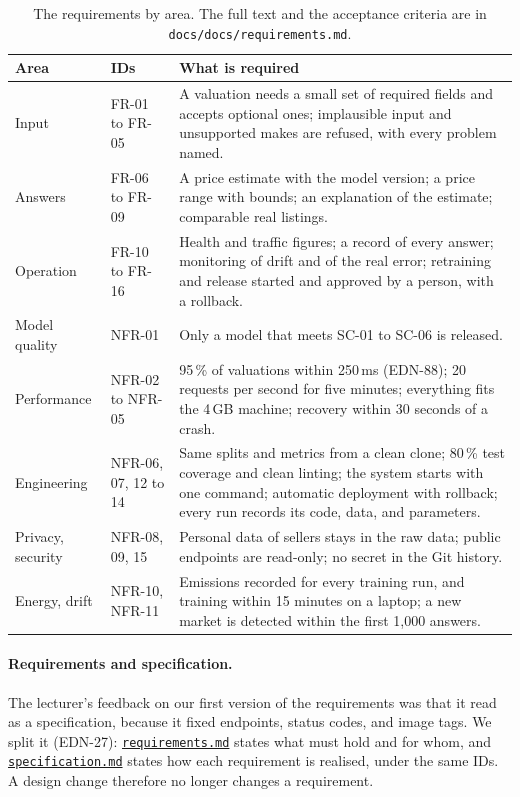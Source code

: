 \begin{table}[ht]
  \centering\small
  \begin{tabularx}{\textwidth}{@{}llX@{}}
    \toprule
    Area & IDs & What is required \\
    \midrule
    Input & FR-01 to FR-05 & A valuation needs a small set of required fields and accepts optional ones; implausible input and unsupported makes are refused, with every problem named. \\
    \addlinespace[2pt]
    Answers & FR-06 to FR-09 & A price estimate with the model version; a price range with bounds; an explanation of the estimate; comparable real listings. \\
    \addlinespace[2pt]
    Operation & FR-10 to FR-16 & Health and traffic figures; a record of every answer; monitoring of drift and of the real error; retraining and release started and approved by a person, with a rollback. \\
    \addlinespace[2pt]
    Model quality & NFR-01 & Only a model that meets SC-01 to SC-06 is released. \\
    \addlinespace[2pt]
    Performance & NFR-02 to NFR-05 & 95\,\% of valuations within 250\,ms (EDN-88); 20 requests per second for five minutes; everything fits the 4\,GB machine; recovery within 30 seconds of a crash. \\
    \addlinespace[2pt]
    Engineering & NFR-06, 07, 12 to 14 & Same splits and metrics from a clean clone; 80\,\% test coverage and clean linting; the system starts with one command; automatic deployment with rollback; every run records its code, data, and parameters. \\
    \addlinespace[2pt]
    Privacy, security & NFR-08, 09, 15 & Personal data of sellers stays in the raw data; public endpoints are read-only; no secret in the Git history. \\
    \addlinespace[2pt]
    Energy, drift & NFR-10, NFR-11 & Emissions recorded for every training run, and training within 15 minutes on a laptop; a new market is detected within the first 1,000 answers. \\
    \bottomrule
  \end{tabularx}
  \caption{The requirements by area. The full text and the acceptance criteria are in \texttt{docs/docs/requirements.md}.}
  \label{tab:requirements}
\end{table}

\paragraph{Requirements and specification.}
The lecturer's feedback on our first version of the requirements was that it read as a specification, because it fixed endpoints, status codes, and image tags.
We split it (EDN-27): \href{https://github.com/mlops-2627q1-mds-upc/MLOPS_Recommenditos/blob/main/docs/docs/requirements.md}{\texttt{requirements.md}} states what must hold and for whom, and \href{https://github.com/mlops-2627q1-mds-upc/MLOPS_Recommenditos/blob/main/docs/docs/specification.md}{\texttt{specification.md}} states how each requirement is realised, under the same IDs.
A design change therefore no longer changes a requirement.

